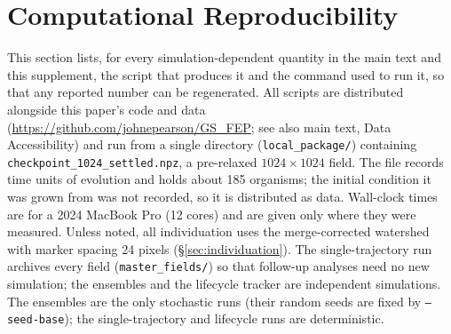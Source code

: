 \documentclass[11pt]{article}
\begin{document}
\section{Computational Reproducibility}
\label{sec:S_reproducibility}

This section lists, for every simulation-dependent quantity in the main text and this supplement, the script that produces it and the command used to run it, so that any reported number can be regenerated. All scripts are distributed alongside this paper's code and data (\url{https://github.com/johnepearson/GS_FEP}; see also main text, Data Accessibility) and run from a single directory (\texttt{local\_package/}) containing \texttt{checkpoint\_1024\_settled.npz}, a pre-relaxed $1024\times1024$ field. The file records \nn{\SettleSteps} time units of evolution and holds about 185 organisms; the initial condition it was grown from was not recorded, so it is distributed as data. Wall-clock times are for a 2024 MacBook Pro (12 cores) and are given only where they were measured. Unless noted, all individuation uses the merge-corrected watershed with marker spacing 24 pixels (\S\ref{sec:individuation}). The single-trajectory run archives every field (\texttt{master\_fields/}) so that follow-up analyses need no new simulation; the ensembles and the lifecycle tracker are independent simulations. The ensembles are the only stochastic runs (their random seeds are fixed by \texttt{--seed-base}); the single-trajectory and lifecycle runs are deterministic.
\end{document}
